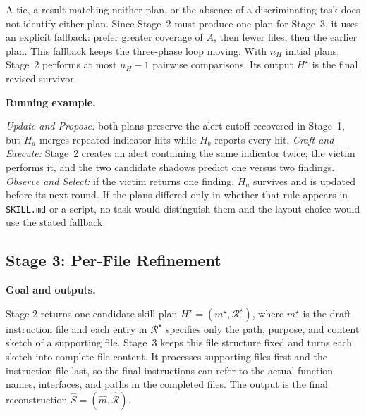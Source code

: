 \documentclass[letterpaper,twocolumn,10pt]{article}
\newcommand{\paragraphtitle}[1]{%
  \vspace{5pt}\noindent\textbf{#1.}%
}
\begin{document}
A tie, a result matching neither plan, or the absence of a
discriminating task does not identify either plan.  Since Stage~2 must
produce one plan for Stage~3, it uses an explicit fallback:
prefer greater coverage of $A$, then fewer files, then the earlier plan.  This
fallback keeps the three-phase loop moving.  With $n_H$ initial plans, Stage~2 performs at
most $n_H-1$ pairwise comparisons.  Its output $H^\star$ is the final revised
survivor.

\paragraphtitle{Running example}
\emph{Update and Propose:} both plans preserve the alert cutoff recovered in
Stage~1, but $H_a$ merges repeated indicator hits while $H_b$ reports every hit.
\emph{Craft and Execute:} Stage~2 creates an alert containing the same indicator
twice; the victim performs it, and the two candidate shadows predict one versus
two findings.  \emph{Observe and Select:} if the victim returns one finding,
$H_a$ survives and is updated before its next round.  If the plans differed
only in whether that rule appears in \texttt{SKILL.md} or a script, no task
would distinguish them and the layout choice would use the stated fallback.

\subsection{Stage 3: Per-File Refinement}
\label{sec:stage3}

\paragraphtitle{Goal and outputs}
Stage 2 returns one candidate skill plan $H^\star=(m^\star,\mathcal{R}^\star)$, where $m^\star$ is the draft instruction file and each entry in $\mathcal{R}^\star$ specifies only the path, purpose, and content sketch of a supporting file. Stage~3 keeps this file structure fixed and turns each sketch into complete file content. It processes supporting files first and the instruction file last, so the final instructions can refer to the actual function names, interfaces, and paths in the completed files. The output is the final reconstruction $\widehat{S}=(\widehat{m},\widehat{\mathcal{R}})$.

\end{document}
